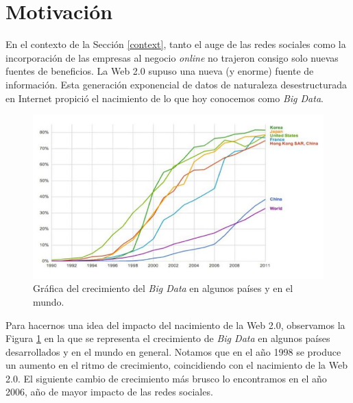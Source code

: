 
	
	\section{Motivación} \label{motivacion}

	En el contexto de la Sección \ref{context}, tanto el auge de las redes sociales como la incorporación de las empresas al negocio \textit{online} no trajeron consigo solo nuevas fuentes de beneficios. La Web 2.0 supuso una nueva (y enorme) fuente de información. Esta generación exponencial de datos de naturaleza desestructurada en Internet propició el nacimiento de lo que hoy conocemos como \textit{Big Data}.
	
	\begin{figure}[h!]
		\centering
		\includegraphics[width=0.7\linewidth]{imagenes/grafica-intro}
		\caption{Gráfica del crecimiento del \textit{Big Data} en algunos países y en el mundo.}
		\label{fig:grafica-intro}
	\end{figure}
	 
	 Para hacernos una idea del impacto del nacimiento de la Web 2.0, observamos la Figura \ref{fig:grafica-intro} en la que se representa el crecimiento de \textit{Big Data} en algunos países desarrollados y en el mundo en general. Notamos que en el año 1998 se produce un aumento en el ritmo de crecimiento, coincidiendo con el nacimiento de la Web 2.0. El siguiente cambio de crecimiento más brusco lo encontramos en el año 2006, año de mayor impacto de las redes sociales. 
	 
	 
